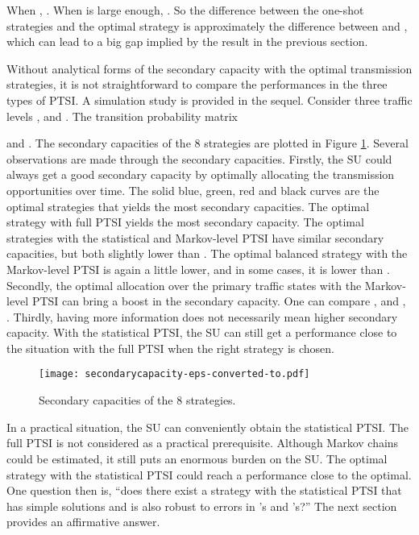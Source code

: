 \documentclass[10pt,final,journal,letterpaper]{IEEEtran}
\begin{document}
When , . When  is large enough, . So the difference between the one-shot strategies and the optimal strategy is approximately the difference between  and , which can lead to a big gap implied by the result in the previous section.

\par
Without analytical forms of the secondary capacity with the optimal transmission strategies, it is not straightforward to compare the performances in the three types of PTSI. A simulation study is provided in the sequel. Consider three traffic levels ,  and . The transition probability matrix

and . The secondary capacities of the 8 strategies are plotted in Figure \ref{fig:sc}. Several observations are made through the secondary capacities. Firstly, the SU could always get a good secondary capacity by optimally allocating the transmission opportunities over time. The solid blue, green, red and black curves are the optimal strategies that yields the most secondary capacities. The optimal strategy with full PTSI yields the most secondary capacity. The optimal strategies with the statistical and Markov-level PTSI have similar secondary capacities, but both slightly lower than . The optimal balanced strategy with the Markov-level PTSI is again a little lower, and in some cases, it is lower than . Secondly, the optimal allocation over the primary traffic states with the Markov-level PTSI can bring a boost in the secondary capacity. One can compare ,  and , . Thirdly, having more information does not necessarily mean higher secondary capacity. With the statistical PTSI, the SU can still get a performance close to the situation with the full PTSI when the right strategy is chosen.
\begin{figure}[!t]
\centering
\texttt{[image: secondarycapacity-eps-converted-to.pdf]}
\caption{Secondary capacities of the 8 strategies.}
\label{fig:sc}
\end{figure}

\par
In a practical situation, the SU can conveniently obtain the statistical PTSI. The full PTSI is not considered as a practical prerequisite. Although Markov chains could be estimated, it still puts an enormous burden on the SU. The optimal strategy with the statistical PTSI could reach a performance close to the optimal. One question then is, ``does there exist a strategy with the statistical PTSI that has simple solutions and is also robust to errors in 's and 's?'' The next section provides an affirmative answer.
\end{document}
